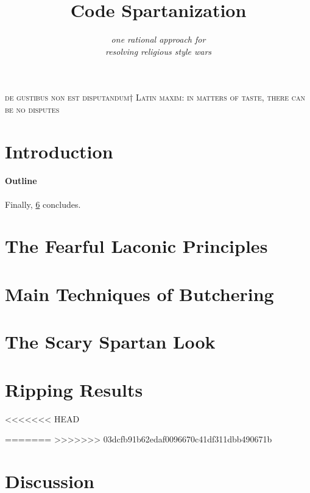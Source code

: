 \documentclass[preprint,10pt,nonatbib]{sigplanconf}
\title{Code Spartanization}
\subtitle{\scriptsize \emph{one rational approach for\\ resolving religious style wars}}
\begin{document}
\textsc{de gustibus non est disputandum†{%
    Latin maxim: in matters of taste, there can be no disputes
}}
{\let\newpage\relax\maketitle}

\begin{abstract}
  
\end{abstract}

\section{Introduction}


\paragraph{Outline}
\label{section:principia}
\label{section:techniques}
\label{section:look}
\label{section:jack}
\label{section:look}
\label{section:initial}
\label{section:zz}
Finally, \cref{section:zz} concludes.

\section{The Fearful Laconic Principles}
\label{section:principia}


\section{Main Techniques of Butchering}
\label{section:techniques}


\section{The Scary Spartan Look}
\label{section:look}


\section{Ripping Results}
\label{section:initial}


<<<<<<< HEAD
% 

=======
>>>>>>> 03dcfb91b62edaf0096670c41df311dbb490671b
\section{Discussion}
\label{section:zz}

\balance
\small

\end{document}
